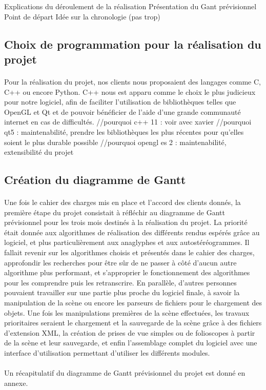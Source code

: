Explications du déroulement de la réalisation
Présentation du Gant prévisionnel
Point de départ
Idée sur la chronologie (pas trop)

\subsection{Choix de programmation pour la réalisation du projet}
\paragraph{}
        Pour la réalisation du projet, nos clients nous proposaient des langages comme C, C++ ou encore Python. C++ nous est apparu comme le choix le plus judicieux pour notre logiciel, afin de faciliter l'utilisation de bibliothèques telles que OpenGL et Qt et de pouvoir bénéficier de l'aide d'une grande communauté internet en cas de difficultés.
        //pourquoi c++ 11 : voir avec xavier
        //pourquoi qt5 : maintenabilité, prendre les bibliothèques les plus récentes pour qu'elles soient le plus durable possible
        //pourquoi opengl es 2 : maintenabilité, extensibilité du projet

\subsection{Création du diagramme de Gantt}
\paragraph{}
        Une fois le cahier des charges mis en place et l'accord des clients donnés, la première étape du projet consistait à réfléchir au diagramme de Gantt prévisionnel pour les trois mois destinés à la réalisation du projet.
        La priorité était donnée aux algorithmes de réalisation des différents rendus espérés grâce au logiciel, et plus particulièrement aux anaglyphes et aux autostéréogrammes. Il fallait revenir sur les algorithmes choisis et présentés dans le cahier des charges, approfondir les recherches pour être sûr de ne passer à côté d'aucun autre algorithme plus performant, et s'approprier le fonctionnement des algorithmes pour les comprendre puis les retranscrire.
        En parallèle, d'autres personnes pouvaient travailler sur une partie plus proche du logiciel finale, à savoir la manipulation de la scène ou encore les parseurs de fichiers pour le chargement des objets.
        Une fois les manipulations premières de la scène effectuées, les travaux prioritaires seraient le chargement et la sauvegarde de la scène grâce à des fichiers d'extension XML, la création de prises de vue simples ou de folioscopes à partir de la scène et leur sauvegarde, et enfin l'assemblage complet du logiciel avec une interface d'utilisation permettant d'utiliser les différents modules.

\paragraph{}
        Un récapitulatif du diagramme de Gantt prévisionnel du projet est donné en annexe.

\paragraph{}
        
